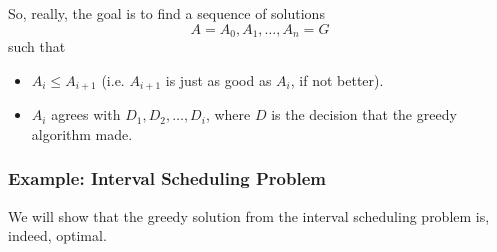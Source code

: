\documentclass[letterpaper]{article}
\begin{document}
\bigskip 

So, really, the goal is to find a sequence of solutions
\[A = A_0, A_1, \dots, A_n = G\]
such that 
\begin{itemize}
    \item $A_i \leq A_{i + 1}$ (i.e. $A_{i + 1}$ is just as good as $A_i$, if not better).
    \item $A_i$ agrees with $D_1, D_2, \dots, D_i$, where $D$ is the decision that the greedy algorithm made. 
\end{itemize}

\subsubsection{Example: Interval Scheduling Problem}
We will show that the greedy solution from the interval scheduling problem is, indeed, optimal. 
\end{document}

